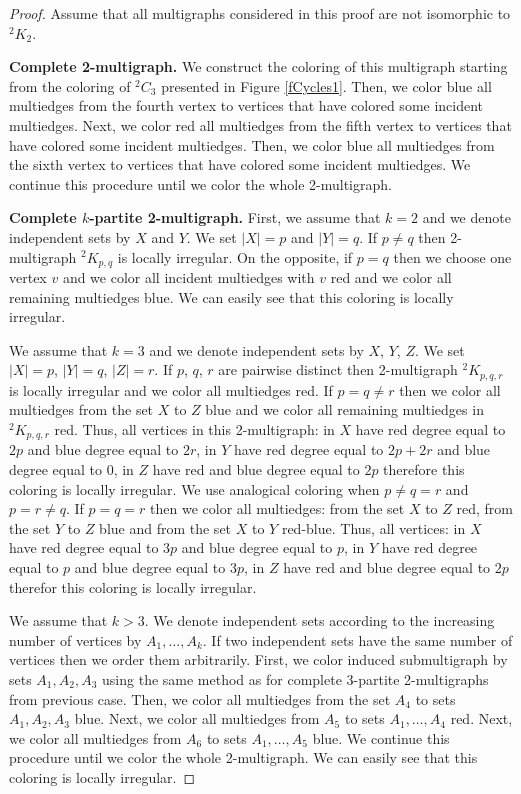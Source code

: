 \documentclass[12pt]{article}
\begin{document}
\begin{proof}
Assume that all multigraphs considered in this proof are not isomorphic to $^2K_2$. 

\textbf{Complete 2-multigraph.} We construct the coloring of this multigraph starting from the coloring of $^2C_3$ presented in Figure  \ref{fCycles1}. Then, we color blue all multiedges from the fourth vertex to vertices that have colored some incident multiedges. Next, we color red all multiedges from the fifth vertex to vertices that have colored some incident multiedges. Then, we color blue all multiedges from the sixth vertex to vertices that have colored some incident multiedges. We continue this procedure until we color the whole 2-multigraph.

\textbf{Complete $k$-partite 2-multigraph.} First, we assume that $k=2$ and we denote independent sets by $X$ and $Y$. We set $|X|=p$ and $|Y|=q$. If $p\neq q$ then 2-multigraph $^2K_{p, q}$ is locally irregular. On the opposite, if $p=q$ then we choose one vertex $v$ and we color all incident multiedges with $v$ red and we color all remaining multiedges blue. We can easily see that this coloring is locally irregular.

We assume that $k=3$ and we denote independent sets by $X$, $Y$, $Z$. We set $|X|=p$, $|Y|=q$, $|Z|=r$. If $p$, $q$, $r$ are pairwise distinct then 2-multigraph $^2K_{p, q, r}$ is locally irregular and we color all multiedges red. If $p=q \neq r$ then we color all multiedges from the set $X$ to $Z$ blue and we color all remaining multiedges in $^2K_{p, q, r}$ red. Thus, all vertices in this 2-multigraph: in $X$ have red degree equal to $2p$ and blue degree equal to $2r$, in $Y$ have red degree equal to $2p+2r$ and blue degree equal to 0, in $Z$ have red and blue degree equal to $2p$ therefore this coloring is locally irregular. We use analogical coloring when $p\neq q = r$ and $p=r \neq q$. If $p=q=r$ then we color all multiedges: from the set $X$ to $Z$ red, from the set $Y$ to $Z$ blue and from the set $X$ to $Y$ red-blue. Thus, all vertices: in $X$ have red degree equal to $3p$ and blue degree equal to $p$, in $Y$ have red degree equal to $p$ and blue degree equal to $3p$, in $Z$ have red and blue degree equal to $2p$ therefor this coloring is locally irregular.

We assume that $k>3$. We denote independent sets according to the increasing number of vertices by $A_1, \dots, A_k$. If two independent sets have the same number of vertices then we order them arbitrarily. First, we color induced submultigraph by sets $A_1, A_2, A_3$ using the same method as for complete $3$-partite 2-multigraphs from previous case. Then, we color all multiedges from the set $A_4$ to sets $A_1, A_2, A_3$ blue. Next, we color all multiedges from $A_5$ to sets $A_1, \dots, A_4$ red. Next, we color all multiedges from $A_6$ to sets $A_1, \dots, A_5$ blue. We continue this procedure until we color the whole 2-multigraph. We can easily see that this coloring is locally irregular.
\end{proof}
\end{document}
